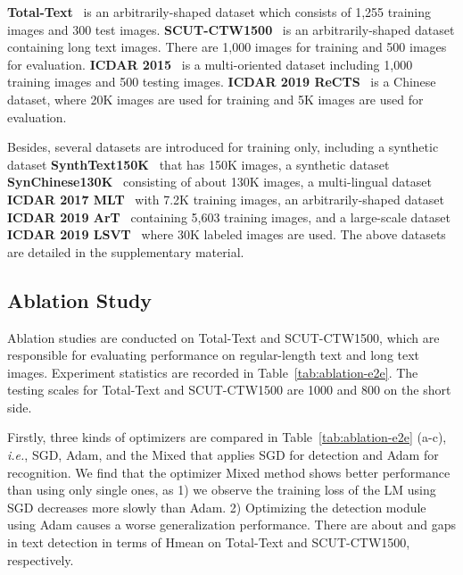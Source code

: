 \documentclass[10pt,journal,compsoc]{IEEEtran}
\def\ie{{\it i.e.}\xspace}
\begin{document}
\textbf{Total-Text}~\cite{ch2020total} is an arbitrarily-shaped dataset which consists of 1,255 training images and 300 test images. \textbf{SCUT-CTW1500}~\cite{liu2019curved} is an arbitrarily-shaped dataset containing long text images. There are 1,000 images for training and 500 images for evaluation. \textbf{ICDAR 2015}~\cite{karatzas2015icdar} is a multi-oriented dataset including 1,000 training images and 500 testing images. \textbf{ICDAR 2019 ReCTS}~\cite{zhang2019icdar} is a Chinese dataset, where 20K images are used for training and 5K images are used for evaluation.

Besides, several datasets are introduced for training only, including a synthetic dataset \textbf{SynthText150K}~\cite{liu2020abcnetv2,liu2020abcnet} that has 150K images, a synthetic dataset \textbf{SynChinese130K}~\cite{liu2020abcnetv2} consisting of about 130K images, a multi-lingual dataset \textbf{ICDAR 2017 MLT}~\cite{nayef2017icdar2017} with 7.2K training images, an arbitrarily-shaped dataset \textbf{ICDAR 2019 ArT}~\cite{chng2019icdar2019} containing 5,603 training images, and a large-scale dataset \textbf{ICDAR 2019 LSVT}~\cite{sun2019icdar} where 30K labeled images are used. The above datasets are detailed in the supplementary material.


\subsection{Ablation Study}
\label{sec:exp_e2e_ablation}

Ablation studies are conducted on Total-Text and SCUT-CTW1500, which are responsible for evaluating performance on regular-length text and long text images. Experiment statistics are recorded in Table~\ref{tab:ablation-e2e}. The testing scales for Total-Text and SCUT-CTW1500 are 1000 and 800 on the short side.


Firstly, three kinds of optimizers are compared in Table~\ref{tab:ablation-e2e} (a-c), \ie, SGD, Adam, and the Mixed that applies SGD for detection and Adam for recognition. We find that the optimizer Mixed method shows better performance than using only single ones, as 1) we observe the training loss of the LM using SGD decreases more slowly than Adam. 2) Optimizing the detection module using Adam causes a worse generalization performance. There are about  and  gaps in text detection in terms of Hmean on Total-Text and SCUT-CTW1500, respectively.
\end{document}
